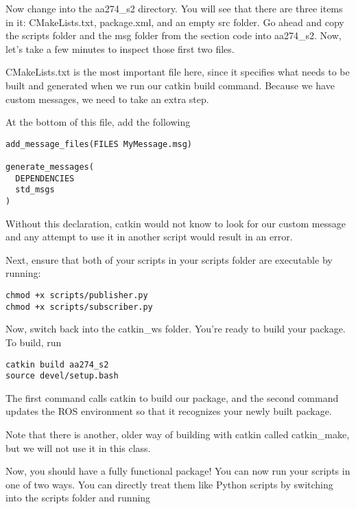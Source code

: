 Now change into the aa274\_s2 directory. You will see that there are three items in it: CMakeLists.txt, package.xml, and an empty src folder. Go ahead and copy the scripts folder and the msg folder from the section code into aa274\_s2. Now, let's take a few minutes to inspect those first two files.

CMakeLists.txt is the most important file here, since it specifies what needs to be built and generated when we run our catkin build command. Because we have custom messages, we need to take an extra step.

At the bottom of this file, add the following

\begin{tcolorbox}
\begin{lstlisting}
add_message_files(FILES MyMessage.msg)

generate_messages(
  DEPENDENCIES
  std_msgs
)
\end{lstlisting}
\end{tcolorbox}

Without this declaration, catkin would not know to look for our custom message and any attempt to use it in another script would result in an error.

Next, ensure that both of your scripts in your scripts folder are executable by running:

\begin{tcolorbox}
\begin{lstlisting}
chmod +x scripts/publisher.py
chmod +x scripts/subscriber.py
\end{lstlisting}
\end{tcolorbox}

Now, switch back into the catkin\_ws folder. You're ready to build your package. To build, run

\begin{tcolorbox}
\begin{lstlisting}
catkin build aa274_s2
source devel/setup.bash
\end{lstlisting}
\end{tcolorbox}

The first command calls catkin to build our package, and the second command updates the ROS environment so that it recognizes your newly built package.

Note that there is another, older way of building with catkin called catkin\_make, but we will not use it in this class.

Now, you should have a fully functional package! You can now run your scripts in one of two ways. You can directly treat them like Python scripts by switching into the scripts folder and running 

